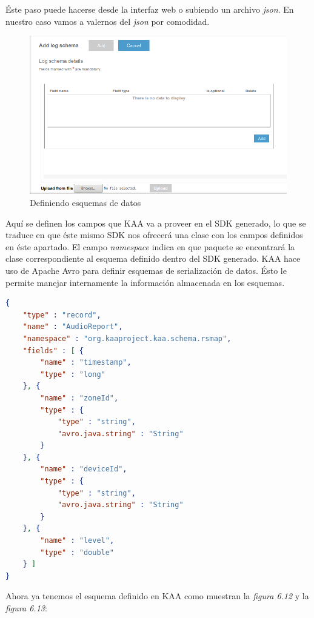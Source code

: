 Éste paso puede hacerse desde la interfaz web o subiendo un archivo \textit{json}. En nuestro caso vamos a valernos del \textit{json} por comodidad.

\begin{figure}[!ht]
  \begin{center}
    \includegraphics[scale=0.45]{../images/kaa/11-2.png}
		\caption{Definiendo esquemas de datos}
    \label{fig:kaa}
	\end{center}
\end{figure}

\newpage

Aquí se definen los campos que KAA va a proveer en el SDK generado, lo que se traduce en que éste mismo SDK nos ofrecerá una clase con los campos definidos en éste apartado. El campo \textit{namespace} indica en que paquete se encontrará la clase correspondiente al esquema definido dentro del SDK generado. KAA hace uso de Apache Avro para definir esquemas de serialización de datos. Ésto le permite manejar internamente la información almacenada en los esquemas.

\bigskip

\begin{lstlisting}[language=json,caption={Esquema de datos en JSON},label={lst:json_personal}]
{
	"type" : "record",
	"name" : "AudioReport",
	"namespace" : "org.kaaproject.kaa.schema.rsmap",
	"fields" : [ {
		"name" : "timestamp",
		"type" : "long"
	}, {
		"name" : "zoneId",
		"type" : {
			"type" : "string",
			"avro.java.string" : "String"
		}
	}, {
		"name" : "deviceId",
		"type" : {
			"type" : "string",
			"avro.java.string" : "String"
		}
	}, {
		"name" : "level",
		"type" : "double"
	} ]
}
\end{lstlisting}

Ahora ya tenemos el esquema definido en KAA como muestran la \textit{figura 6.12} y la \textit{figura 6.13}:

